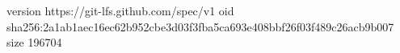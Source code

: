 version https://git-lfs.github.com/spec/v1
oid sha256:2a1ab1aec16ec62b952cbe3d03f3fba5ca693e408bbf26f03f489c26acb9b007
size 196704
